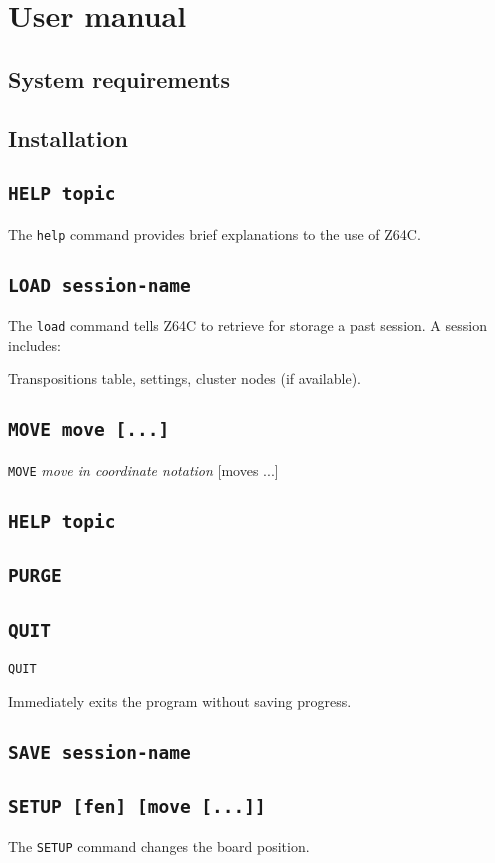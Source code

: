 \chapter{User manual}

\section{System requirements}

\section{Installation}

\section{\texttt{\textbf{HELP} topic}}
The \texttt{help} command provides brief explanations to the use of Z64C.

\section{\texttt{\textbf{LOAD} session-name}}

The \texttt{load} command tells Z64C to retrieve for storage a past session. A
session includes:

Transpositions table,
settings,
cluster nodes (if available).

\section{\texttt{MOVE move [...]}}

\texttt{MOVE} \textit{move in coordinate notation} [moves ...]

\section{\texttt{HELP topic}}
\section{\texttt{PURGE}}
\section{\texttt{QUIT}}

\texttt{QUIT}

Immediately exits the program without saving progress.

\section{\texttt{SAVE session-name}}
\section{\texttt{SETUP [fen] [move [...]]}}

The \texttt{SETUP} command changes the board position.
